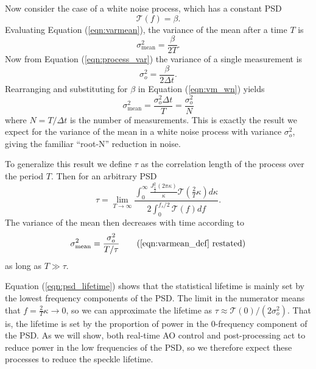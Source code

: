 \documentclass[10pt,preprint]{aastex631}
\begin{document}
Now consider the case of a white noise process, which has a constant PSD
\begin{equation}
\mathcal{T}(f) = \beta.
\end{equation}
Evaluating Equation (\ref{eqn:varmean}), the variance of the mean after a time $T$ is 
\begin{equation}
\sigma_\mathrm{mean}^2 = \frac{\beta}{2T}.
\label{eqn:vm_wn}
\end{equation}
Now from Equation (\ref{eqn:process_var}) the variance of a single measurement is
\begin{equation}
\sigma_o^2  = \frac{\beta}{2\Delta t}.
\end{equation}
Rearranging and substituting for $\beta$ in Equation (\ref{eqn:vm_wn}) yields
\begin{equation}
\sigma_\mathrm{mean}^2 =  \frac{\sigma_o^2 \Delta t}{T} = \frac{\sigma_o^2}{N}
\end{equation}
where $N = T/\Delta t$ is the number of measurements.  This is exactly the result we expect for the variance of the mean in a white noise process with variance $\sigma^2_o$, giving the familiar ``root-N'' reduction in noise.

To generalize this result we define $\tau$ as the correlation length of the process over the period $T$.  Then for an arbitrary PSD
\begin{equation}
\tau = \lim_{T\to\infty}\frac{ \displaystyle\int_0^{\infty} \frac{ J_{\frac{1}{2}}^2(2\pi \kappa)}{\kappa} \mathcal{T}\left( \frac{2}{T} \kappa \right) d\kappa}{ 2 \displaystyle\int_{0}^{f_s/2} \mathcal{T}(f) df}.
\label{eqn:psd_lifetime}
\end{equation}
The variance of the mean then decreases with time according to
\begin{equation}
\sigma_\mathrm{mean}^2 =  \frac{\sigma_o^2}{T/\tau} \tag{\ref{eqn:varmean_def} restated}
\end{equation}
as long as $T \gg \tau$.

Equation (\ref{eqn:psd_lifetime}) shows that the statistical lifetime is mainly set by the lowest frequency components of the PSD.  The limit in the numerator means that $f = \frac{2}{T}\kappa \rightarrow 0$, so we can approximate the lifetime as $\tau \approx \mathcal{T}(0)/(2\sigma_o^2)$.  That is, the lifetime is set by the proportion of power in the 0-frequency component of the PSD.  As we will show, both real-time AO control and post-processing act to reduce power in the low frequencies of the PSD, so we therefore expect these processes to reduce the speckle lifetime.
\end{document}
